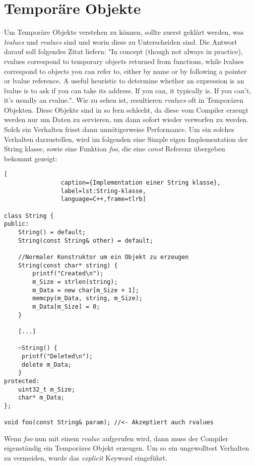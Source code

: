 \section{Temporäre Objekte}
Um Temporäre Objekte verstehen zu können, sollte zuerst geklärt werden, was \emph{lvalues} und \emph{rvalues} sind und worin diese zu Unterscheiden sind. Die Antwort darauf soll folgendes Zitat liefern: "In concept (though not always in practice), rvalues correspond to temporary objects returned from functions, while lvalues correspond to objects you can refer to, either by name or by following a pointer or lvalue reference. A useful heuristic to determine whether an expression is an lvalue is to ask if you can take its address. If you can, it typically is. If you can’t, it’s usually an rvalue.". \cite{EffectiveC++} Wie zu sehen ist, resultieren \emph{rvalues} oft in Temporären Objekten. Diese Objekte sind in so fern schlecht, da diese vom Compiler erzeugt werden nur um Daten zu servieren, um dann sofort wieder verworfen zu werden. Solch ein Verhalten frisst dann unnötigerweise Performance.\cite{HandsOn}
\newline
\newline
Um ein solches Verhalten darzustellen, wird im folgenden eine Simple eigen Implementation der String klasse, sowie eine Funktion \emph{foo}, die eine \emph{const} Referenz übergeben bekommt gezeigt:

\begin{lstlisting}[
  				caption={Implementation einer String klasse},
  				label=lst:String-klasse,
  				language=C++,frame=tlrb]
  				
class String {
public:
	String() = default;
	String(const String& other) = default;
	
	//Normaler Konstruktor um ein Objekt zu erzeugen
	String(const char* string) {
		printf("Created\n");
		m_Size = strlen(string);
		m_Data = new char[m_Size + 1];
		memcpy(m_Data, string, m_Size);
		m_Data[m_Size] = 0;
	}
	
	[...]
    
	~String() {
     printf("Deleted\n");
     delete m_Data;
    }
protected:
    uint32_t m_Size;
    char* m_Data;
};
				
void foo(const String& param); //<- Akzeptiert auch rvalues
			\end{lstlisting}
			
Wenn \emph{foo} nun mit einem \emph{rvalue} aufgerufen wird, dann muss der Compiler eigenständig ein Temporäres Objekt erzeugen. Um so ein ungewolltest Verhalten zu vermeiden, wurde das \emph{explicit} Keyword eingeführt.  
